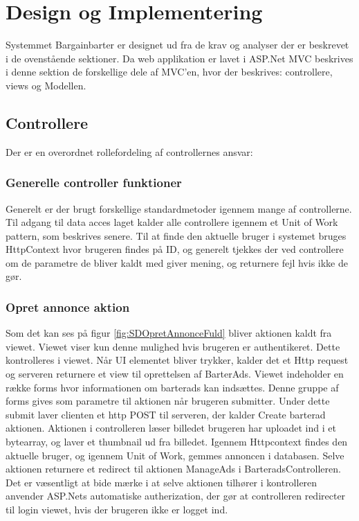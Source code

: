 \chapter{Design og Implementering}
Systemmet Bargainbarter er designet ud fra de krav og analyser der er beskrevet i de ovenstående sektioner. Da web applikation er lavet i ASP.Net MVC beskrives i denne sektion de forskellige dele af MVC'en, hvor der beskrives: controllere, views og Modellen. 


\section{Controllere}
Der er en overordnet rollefordeling af controllernes ansvar: 



\subsection{Generelle controller funktioner}

Generelt er der brugt forskellige standardmetoder igennem mange af controllerne. Til adgang til data acces laget kalder alle controllere igennem et Unit of Work pattern, som beskrives senere. Til at finde den aktuelle bruger i systemet bruges HttpContext hvor brugeren findes på ID, og generelt tjekkes der ved controllere om de parametre de bliver kaldt med giver mening, og returnere fejl hvis ikke de gør.  

\subsection{Opret annonce aktion}

Som det kan ses på figur \ref{fig:SDOpretAnnonceFuld} bliver aktionen kaldt fra viewet. Viewet viser kun denne mulighed hvis brugeren er authentikeret. Dette kontrolleres i viewet. Når UI elementet bliver trykker, kalder det et Http request og serveren returnere et view til oprettelsen af BarterAds.
Viewet indeholder en række forms hvor informationen om barterads kan indsættes. Denne gruppe af forms gives som parametre til aktionen når brugeren submitter. Under dette submit laver clienten et http POST til serveren, der kalder Create barterad aktionen. Aktionen i controlleren læser billedet brugeren har uploadet ind i et bytearray, og laver et thumbnail ud fra billedet. Igennem Httpcontext findes den aktuelle bruger, og igennem Unit of Work, gemmes annoncen i databasen. Selve aktionen returnere et redirect til aktionen ManageAds i BarteradsControlleren. Det er væsentligt at bide mærke i at selve aktionen tilhører i kontrolleren anvender ASP.Nets automatiske autherization, der gør at controlleren redirecter til login viewet, hvis der brugeren ikke er logget ind.


